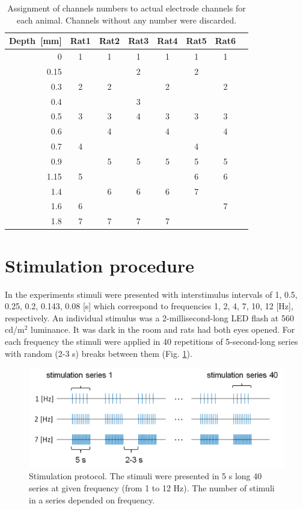 \documentclass{pracalicmgr}
\begin{document}
   \begin{table}[H]
   	\caption{Assignment of channels numbers to actual electrode channels for each animal. Channels without any number were discarded.}
   	\begin{center}
   		\begin{tabularx}{0.9\textwidth}{R C C C C C C C}
   			\toprule
   			\textbf{Depth~[mm]} & \textbf{Rat1} & \textbf{Rat2} & \textbf{Rat3} & \textbf{Rat4} & \textbf{Rat5} & \textbf{Rat6} \\
   			 & 1 & 1 & 1 & 1 & 1 & 1 \\
   			0.15 &  &  & 2 & & 2&  \\
   			0.3 & 2 & 2 &  & 2 & & 2 \\
   			0.4 &  &  & 3 &  &  &  \\
   			0.5 & 3 & 3 &4  & 3 & 3 & 3 \\
   			0.6 & & 4 &  & 4 & & 4 \\
   			0.7 & 4 &  &  &  & 4 &  \\
   			0.9 & & 5 & 5 & 5 & 5& 5 \\
   			1.15 & 5 &  &  &  & 6 & 6 \\
   			1.4 & & 6 & 6 & 6 & 7 &  \\
   			1.6 & 6 &  &  &  & & 7 \\
   			1.8 & 7 & 7 & 7 & 7 & &  \\
   			\bottomrule
   		\end{tabularx}
   	\end{center}
   	\label{tab:chosen_chan}
   \end{table}
   \newpage
   \section{Stimulation procedure}
   In the experiments stimuli were presented with interstimulus intervals of  1, 0.5, 0.25, 0.2, 0.143, 0.08 [s] which correspond to frequencies 1, 2, 4, 7, 10, 12 [Hz], respectively. An individual stimulus was a 2-millisecond-long LED flash at 560 cd/m$^2$ luminance. It was dark in the room and rats had both eyes opened. For each frequency the stimuli were applied in 40 repetitions of 5-second-long series with random (2-3 s) breaks between them (Fig. \ref{rys:stimuli}).
   \begin{figure}[htbp]
   	\begin{center}
   		\includegraphics[scale=0.5]{paradigms.png}
   	\end{center}
   	\caption{ Stimulation protocol. The stimuli were presented in 5 s long 40 series at given frequency (from 1 to 12 Hz). The number of stimuli in a series depended on frequency.}
   	\label{rys:stimuli}
   \end{figure} 
   
\end{document}
